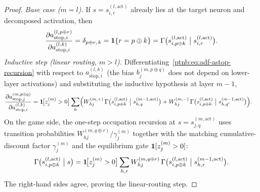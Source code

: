\begin{proof}
\emph{Base case ($m = l$).} If $s = s_{i,r}^{(l, \mathrm{act})}$ already lies at the target neuron
and decomposed activation, then
\begin{align}
    \frac{\partial a_{\mathrm{stop},i}^{(l, p \oplus r)}}{\partial a_{\mathrm{stop},i}^{(l, k)}}
    = \delta_{p \oplus r,\, k}
    = \mathbf{1}\{r = p \oplus k\}
    = \Gamma\bigl(s_{i, p \oplus k}^{(l, \mathrm{act})} \bigm| s_{i,r}^{(l, \mathrm{act})}\bigr).
\end{align}
\emph{Inductive step (linear routing, $m > l$).} Differentiating~\eqref{ptnb:eq:adf-astop-recursion}
with respect to $a_{\mathrm{stop},i}^{(l, k)}$ (the bias $b_j^{(m, p \oplus q)}$ does not depend on
lower-layer activations) and substituting the inductive hypothesis at layer $m-1$,
\begin{align}
    \frac{\partial a_{\mathrm{stop},j}^{(m, p \oplus q)}}{\partial a_{\mathrm{stop},i}^{(l, k)}}
    &= \mathbf{1}\!\bigl[z_j^{(m)} > 0\bigr]
    \sum_h \Bigl( W_{hj}^{(m,+)}\, \Gamma\bigl(s_{i, p \oplus k}^{(l, \mathrm{act})} \bigm| s_{h,
    q}^{(m-1, \mathrm{act})}\bigr)
    + W_{hj}^{(m,-)}\, \Gamma\bigl(s_{i, p \oplus k}^{(l, \mathrm{act})} \bigm| s_{h, q'}^{(m-1,
    \mathrm{act})}\bigr) \Bigr).
\end{align}
On the game side, the one-step occupation recursion at $s = s_{j,q}^{(m, \mathrm{act})}$ uses
transition probabilities $W_{hj}^{(m, q \oplus r)} / \gamma_j^{(m)}$ together with the matching
cumulative-discount factor $\gamma_j^{(m)}$ and the equilibrium gate $\mathbf{1}[z_j^{(m)} > 0]$:
\begin{align}
    \Gamma\bigl(s_{i, p \oplus k}^{(l, \mathrm{act})} \bigm| s\bigr)
    = \mathbf{1}\!\bigl[z_j^{(m)} > 0\bigr] \sum_{h, r} W_{hj}^{(m, q \oplus r)}\, \Gamma\bigl(s_{i, p \oplus
    k}^{(l, \mathrm{act})} \bigm| s_{h, r}^{(m-1, \mathrm{act})}\bigr).
\end{align}
The right-hand sides agree, proving the linear-routing step.


\end{proof}
